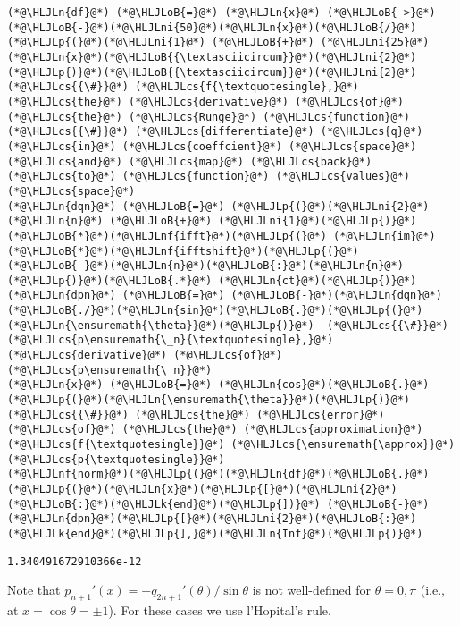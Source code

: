\documentclass[12pt,a4paper]{article}
\newcommand{\HLJLk}[1]{\textcolor[RGB]{148,91,176}{\textbf{#1}}}
\newcommand{\HLJLn}[1]{#1}
\newcommand{\HLJLnf}[1]{\textcolor[RGB]{66,102,213}{#1}}
\newcommand{\HLJLni}[1]{\textcolor[RGB]{59,151,46}{#1}}
\newcommand{\HLJLoB}[1]{\textcolor[RGB]{102,102,102}{\textbf{#1}}}
\newcommand{\HLJLp}[1]{#1}
\newcommand{\HLJLcs}[1]{\textcolor[RGB]{153,153,119}{\textit{#1}}}
\begin{document}
\begin{lstlisting}
(*@\HLJLn{df}@*) (*@\HLJLoB{=}@*) (*@\HLJLn{x}@*) (*@\HLJLoB{->}@*) (*@\HLJLoB{-}@*)(*@\HLJLni{50}@*)(*@\HLJLn{x}@*)(*@\HLJLoB{/}@*)(*@\HLJLp{(}@*)(*@\HLJLni{1}@*) (*@\HLJLoB{+}@*) (*@\HLJLni{25}@*)(*@\HLJLn{x}@*)(*@\HLJLoB{{\textasciicircum}}@*)(*@\HLJLni{2}@*)(*@\HLJLp{)}@*)(*@\HLJLoB{{\textasciicircum}}@*)(*@\HLJLni{2}@*) (*@\HLJLcs{{\#}}@*) (*@\HLJLcs{f{\textquotesingle},}@*) (*@\HLJLcs{the}@*) (*@\HLJLcs{derivative}@*) (*@\HLJLcs{of}@*) (*@\HLJLcs{the}@*) (*@\HLJLcs{Runge}@*) (*@\HLJLcs{function}@*)
(*@\HLJLcs{{\#}}@*) (*@\HLJLcs{differentiate}@*) (*@\HLJLcs{q}@*) (*@\HLJLcs{in}@*) (*@\HLJLcs{coeffcient}@*) (*@\HLJLcs{space}@*) (*@\HLJLcs{and}@*) (*@\HLJLcs{map}@*) (*@\HLJLcs{back}@*) (*@\HLJLcs{to}@*) (*@\HLJLcs{function}@*) (*@\HLJLcs{values}@*) (*@\HLJLcs{space}@*)
(*@\HLJLn{dqn}@*) (*@\HLJLoB{=}@*) (*@\HLJLp{(}@*)(*@\HLJLni{2}@*)(*@\HLJLn{n}@*) (*@\HLJLoB{+}@*) (*@\HLJLni{1}@*)(*@\HLJLp{)}@*)(*@\HLJLoB{*}@*)(*@\HLJLnf{ifft}@*)(*@\HLJLp{(}@*) (*@\HLJLn{im}@*)(*@\HLJLoB{*}@*)(*@\HLJLnf{ifftshift}@*)(*@\HLJLp{(}@*)(*@\HLJLoB{-}@*)(*@\HLJLn{n}@*)(*@\HLJLoB{:}@*)(*@\HLJLn{n}@*)(*@\HLJLp{)}@*)(*@\HLJLoB{.*}@*) (*@\HLJLn{ct}@*)(*@\HLJLp{)}@*) 
(*@\HLJLn{dpn}@*) (*@\HLJLoB{=}@*) (*@\HLJLoB{-}@*)(*@\HLJLn{dqn}@*) (*@\HLJLoB{./}@*)(*@\HLJLn{sin}@*)(*@\HLJLoB{.}@*)(*@\HLJLp{(}@*)(*@\HLJLn{\ensuremath{\theta}}@*)(*@\HLJLp{)}@*)  (*@\HLJLcs{{\#}}@*) (*@\HLJLcs{p\ensuremath{\_n}{\textquotesingle},}@*) (*@\HLJLcs{derivative}@*) (*@\HLJLcs{of}@*) (*@\HLJLcs{p\ensuremath{\_n}}@*)
(*@\HLJLn{x}@*) (*@\HLJLoB{=}@*) (*@\HLJLn{cos}@*)(*@\HLJLoB{.}@*)(*@\HLJLp{(}@*)(*@\HLJLn{\ensuremath{\theta}}@*)(*@\HLJLp{)}@*)
(*@\HLJLcs{{\#}}@*) (*@\HLJLcs{the}@*) (*@\HLJLcs{error}@*) (*@\HLJLcs{of}@*) (*@\HLJLcs{the}@*) (*@\HLJLcs{approximation}@*) (*@\HLJLcs{f{\textquotesingle}}@*) (*@\HLJLcs{\ensuremath{\approx}}@*) (*@\HLJLcs{p{\textquotesingle}}@*)
(*@\HLJLnf{norm}@*)(*@\HLJLp{(}@*)(*@\HLJLn{df}@*)(*@\HLJLoB{.}@*)(*@\HLJLp{(}@*)(*@\HLJLn{x}@*)(*@\HLJLp{[}@*)(*@\HLJLni{2}@*)(*@\HLJLoB{:}@*)(*@\HLJLk{end}@*)(*@\HLJLp{])}@*) (*@\HLJLoB{-}@*) (*@\HLJLn{dpn}@*)(*@\HLJLp{[}@*)(*@\HLJLni{2}@*)(*@\HLJLoB{:}@*)(*@\HLJLk{end}@*)(*@\HLJLp{],}@*)(*@\HLJLn{Inf}@*)(*@\HLJLp{)}@*)
\end{lstlisting}

\begin{lstlisting}
1.340491672910366e-12
\end{lstlisting}


Note that $p_{n+1}'(x) = -q_{2n+1}'(\theta)/\sin \theta$ is not well-defined for $\theta = 0, \pi$ (i.e., at $x = \cos\theta =  \pm 1$).  For these cases we use l'Hopital's rule.
\end{document}

